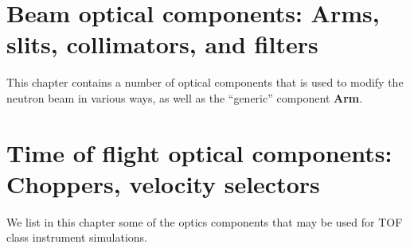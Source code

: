 
\chapter{Beam optical components:
Arms, slits, collimators, and filters}
This chapter contains a number of optical components
that is used to modify the neutron beam in various ways,
as well as the ``generic'' component {\bf Arm}.



\newpage


\newpage


\newpage


\newpage


\newpage


\newpage


\chapter{Time of flight optical components:
Choppers, velocity selectors}
We list in this chapter some of the optics components that may be used for TOF class instrument simulations.

\newpage


\newpage


\newpage


\newpage

